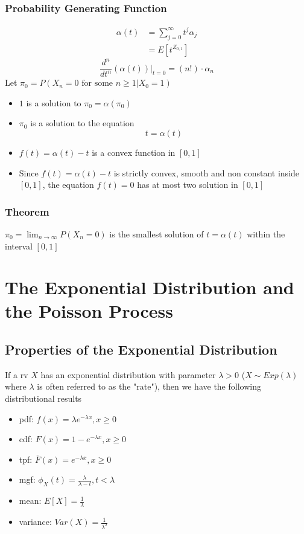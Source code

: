 \documentclass[11pt]{article}
\newcommand{\ds}{\displaystyle}
\begin{document}
\subsubsection{Probability Generating Function}
\begin{align*}
    \alpha(t) &= \sum_{j=0}^{\infty}t^j\alpha_j \\
    &= E[t^{Z_{0,1}}]
\end{align*}
\[\frac{d^n}{dt^n}(\alpha(t))\bigg|_{t=0} = (n!)\cdot \alpha_n\]
Let $\pi_0 = P(X_n=0\text{ for some } n\geq1|X_0=1)$ 
\begin{itemize}
    \item $1$ is a solution to $\pi_0=\alpha(\pi_0)$
    \item $\pi_0$ is a solution to the equation \[t=\alpha(t)\]
    \item $f(t) = \alpha(t)-t$ is a convex function in $[0,1]$
    \item Since $f(t) = \alpha(t)-t$ is strictly convex, smooth and non constant inside $[0,1]$, the equation $f(t)=0$ has at most two solution in $[0,1]$
\end{itemize}
\subsubsection*{Theorem}
$\pi_0 = \ds\lim_{n\to\infty}P(X_n=0)$ is the smallest solution of $t=\alpha(t)$ within the interval $[0,1]$

\newpage 

\section{The Exponential Distribution and the Poisson Process}
\subsection{Properties of the Exponential Distribution}
If a rv $X$ has an exponential distribution with parameter $\lambda>0$ ($X\sim Exp(\lambda)$ where $\lambda$ is often referred to as the "rate"),
then we have the following distributional results 
\begin{itemize}
    \item pdf: $f(x) = \lambda e^{-\lambda x}, x\geq 0$
    \item cdf: $F(x) = 1-e^{-\lambda x}, x\geq 0$
    \item tpf: $\overline{F}(x) = e^{-\lambda x}, x\geq 0$
    \item mgf: $\phi_X(t) = \frac{\lambda}{\lambda-t}, t<\lambda$
    \item mean: $E[X] = \frac{1}{\lambda}$
    \item variance: $Var(X) = \frac{1}{\lambda^2}$
\end{itemize}
\end{document}
